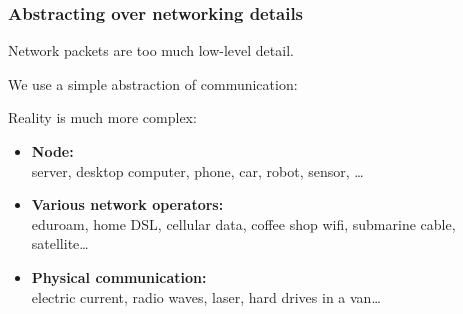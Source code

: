 \begin{frame}[plain]
    \label{s:wireshark}
\end{frame}
\label{l:wireshark}

\begin{frame}
    \label{s:networking}
    \frametitle{Abstracting over networking details}
    Network packets are too much low-level detail.

    We use a simple abstraction of communication:
    \begin{center}
    \end{center}\pause

    Reality is much more complex:
    \begin{itemize}
        \item \textbf{Node:}\\ server, desktop computer, phone, car, robot, sensor, \dots\pause
        \item \textbf{Various network operators:}\\ eduroam, home DSL, cellular data, coffee shop wifi, submarine cable, satellite\dots\pause
        \item \textbf{Physical communication:}\\ electric current, radio waves, laser, hard drives in a van\dots
    \end{itemize}
\end{frame}

